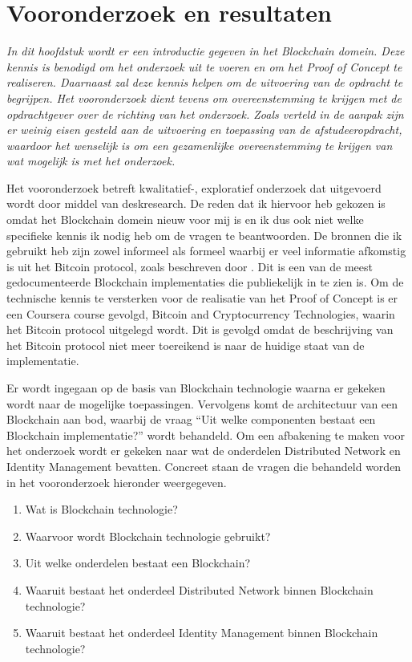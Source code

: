 \chapter{Vooronderzoek en resultaten}

\textit{In dit hoofdstuk wordt er een introductie gegeven in het Blockchain domein. Deze kennis is benodigd om het onderzoek uit te voeren en om het Proof of Concept te realiseren. Daarnaast zal deze kennis helpen om de uitvoering van de opdracht te begrijpen. Het vooronderzoek dient tevens om overeenstemming te krijgen met de opdrachtgever over de richting van het onderzoek. Zoals verteld in de aanpak zijn er weinig eisen gesteld aan de uitvoering en toepassing van de afstudeeropdracht, waardoor het wenselijk is om een gezamenlijke overeenstemming te krijgen van wat mogelijk is met het onderzoek.}

Het vooronderzoek betreft kwalitatief-, exploratief onderzoek dat uitgevoerd wordt door middel van deskresearch. De reden dat ik hiervoor heb gekozen is omdat het Blockchain domein nieuw voor mij is en ik dus ook niet welke specifieke kennis ik nodig heb om de vragen te beantwoorden. De bronnen die ik gebruikt heb zijn zowel informeel als formeel waarbij er veel informatie afkomstig is uit het Bitcoin protocol, zoals beschreven door \cite{nakamoto2008bitcoin}. Dit is een van de meest gedocumenteerde Blockchain implementaties die publiekelijk in te zien is. Om de technische kennis te versterken voor de realisatie van het Proof of Concept is er een Coursera course gevolgd, Bitcoin and Cryptocurrency Technologies, waarin het Bitcoin protocol uitgelegd wordt. Dit is gevolgd omdat de beschrijving van het Bitcoin protocol niet meer toereikend is naar de huidige staat van de implementatie.

Er wordt ingegaan op de basis van Blockchain technologie waarna er gekeken wordt naar de mogelijke toepassingen. Vervolgens komt de architectuur van een Blockchain aan bod, waarbij de vraag ``Uit welke componenten bestaat een Blockchain implementatie?'' wordt behandeld. Om een afbakening te maken voor het onderzoek wordt er gekeken naar wat de onderdelen Distributed Network en Identity Management bevatten. Concreet staan de vragen die behandeld worden in het vooronderzoek hieronder weergegeven.

\begin{enumerate}[noitemsep]
  \item Wat is Blockchain technologie?
  \item Waarvoor wordt Blockchain technologie gebruikt?
  \item Uit welke onderdelen bestaat een Blockchain?
  \item Waaruit bestaat het onderdeel Distributed Network binnen Blockchain technologie?
  \item Waaruit bestaat het onderdeel Identity Management binnen Blockchain technologie?
\end{enumerate}

